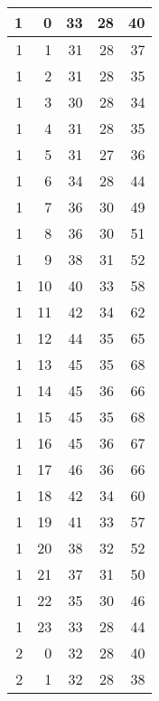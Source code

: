   
    \begin{longtable}{|r|r|r|r|r|}
		\hline
    1     & 0     & 33    & 28    & 40 \\
    \hline
    1     & 1     & 31    & 28    & 37 \\
    \hline
    1     & 2     & 31    & 28    & 35 \\
    \hline
    1     & 3     & 30    & 28    & 34 \\
    \hline
    1     & 4     & 31    & 28    & 35 \\
    \hline
    1     & 5     & 31    & 27    & 36 \\
    \hline
    1     & 6     & 34    & 28    & 44 \\
    \hline
    1     & 7     & 36    & 30    & 49 \\
    \hline
    1     & 8     & 36    & 30    & 51 \\
    \hline
    1     & 9     & 38    & 31    & 52 \\
    \hline
    1     & 10    & 40    & 33    & 58 \\
    \hline
    1     & 11    & 42    & 34    & 62 \\
    \hline
    1     & 12    & 44    & 35    & 65 \\
    \hline
    1     & 13    & 45    & 35    & 68 \\
    \hline
    1     & 14    & 45    & 36    & 66 \\
    \hline
    1     & 15    & 45    & 35    & 68 \\
    \hline
    1     & 16    & 45    & 36    & 67 \\
    \hline
    1     & 17    & 46    & 36    & 66 \\
    \hline
    1     & 18    & 42    & 34    & 60 \\
    \hline
    1     & 19    & 41    & 33    & 57 \\
    \hline
    1     & 20    & 38    & 32    & 52 \\
    \hline
    1     & 21    & 37    & 31    & 50 \\
    \hline
    1     & 22    & 35    & 30    & 46 \\
    \hline
    1     & 23    & 33    & 28    & 44 \\
    \hline
    2     & 0     & 32    & 28    & 40 \\
    \hline
    2     & 1     & 32    & 28    & 38 \\

\end{longtable}
